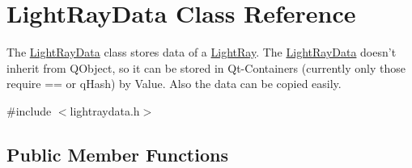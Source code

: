 \hypertarget{class_light_ray_data}{\section{Light\+Ray\+Data Class Reference}
\label{class_light_ray_data}
}


The \hyperlink{class_light_ray_data}{Light\+Ray\+Data} class stores data of a \hyperlink{class_light_ray}{Light\+Ray}. The \hyperlink{class_light_ray_data}{Light\+Ray\+Data} doesn't inherit from Q\+Object, so it can be stored in Qt-\/\+Containers (currently only those require == or q\+Hash) by Value. Also the data can be copied easily.  




{\ttfamily \#include $<$lightraydata.\+h$>$}

\subsection*{Public Member Functions}
